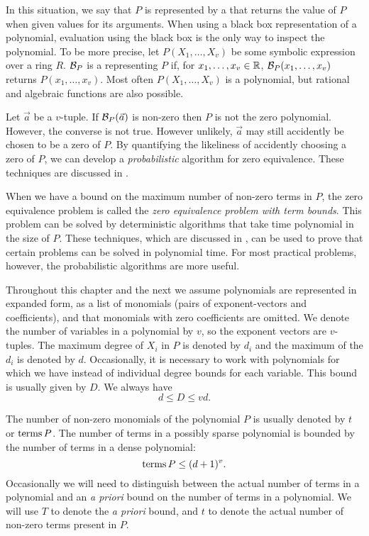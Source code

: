 In this situation, we say that $P$ is represented by a  that returns the value of $P$ when given values for its
arguments.  When using a black box representation of a polynomial,
evaluation using the black box is the only way to inspect the
polynomial.  To be more precise, let $P(X_1, \ldots, X_v)$ be some
symbolic expression over a ring $R$.  ${\cal B}_P$ is a  representing $P$ if, for $x_1, \ldots, x_v \in \mathbb{R}$,  ${\cal
B}_P(x_1, \ldots, x_v)$ returns $P(x_1, \ldots, x_v)$.  Most often
$P(X_1, \ldots, X_v)$ is a polynomial, but rational and algebraic
functions are also possible.

Let $\vec{a}$ be a $v$-tuple.  If ${\cal B}_P(\vec{a})$ is non-zero
then $P$ is not the zero polynomial.  However, the converse is not
true.  However unlikely, $\vec{a}$ may still accidently be chosen to
be a zero of $P$.  By quantifying the likeliness of accidently
choosing a zero of $P$, we can develop a {\em probabilistic}
algorithm for zero equivalence.  These techniques are discussed in
.

When we have a bound on the maximum number of non-zero terms in $P$,
the zero equivalence problem is called the {\em zero equivalence
problem with term bounds\/}. This problem can be solved by deterministic algorithms that
take time polynomial in the size of $P$.  These techniques, which are
discussed in , can be used to prove
that certain problems can be solved in polynomial time.  For most
practical problems, however, the probabilistic algorithms are more
useful.

Throughout this chapter and the next we assume polynomials are
represented in expanded form, as a list of monomials (pairs of
exponent-vectors and coefficients), and that monomials with zero
coefficients are omitted.  We denote the number of variables in a
polynomial by $v$, so the exponent vectors are $v$-tuples.  The
maximum degree of $X_i$ in $P$ is denoted by $d_i$ and the maximum of
the $d_i$ is denoted by $d$.  Occasionally, it is necessary to work
with polynomials for which we have  instead
of individual degree bounds for each variable.  This bound is usually
given by $D$.  We always have
\[
d \le D \le vd.
\]

The number of non-zero monomials of the polynomial $P$ is usually
denoted by $t$ or $\operatorname{terms} P$.  The number of terms in a possibly
sparse polynomial is bounded by the number of terms in a dense
polynomial:
\[
\operatorname{terms} P \le (d+1)^v.
\]
Occasionally we will need to distinguish between the actual number of
terms in a polynomial and an {\em a priori} bound on the number of
terms in a polynomial.  We will use $T$ to denote the {\em a priori}
bound, and $t$ to denote the actual number of non-zero terms present
in $P$.

